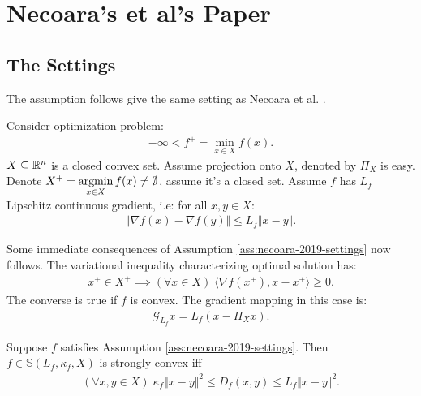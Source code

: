 \documentclass[12pt]{report}
\begin{document}
    \section{Necoara's et al's Paper}
        \subsection{The Settings}
            The assumption follows give the same setting as Necoara et al. \cite{necoara_linear_2019}. 
            \begin{assumption}\label{ass:necoara-2019-settings}
                Consider optimization problem: 
                \begin{align}
                    -\infty < f^+ = \min_{x \in X} f(x) . 
                \end{align}\label{problem:necoara-2019}
                $X\subseteq \mathbb R^n$ is a closed convex set. 
                Assume projection onto $X$, denoted by $\Pi_X$ is easy. 
                Denote $X^+ = \mathop{\rm argmin}\limits_{x \in X}f(x) \neq \emptyset$, assume it's a closed set. 
                Assume $f$ has $L_f$ Lipschitz continuous gradient, i.e: for all $x, y\in X$: 
                \begin{align*}
                    \Vert \nabla f(x) - \nabla f(y)\Vert \le L_f\Vert x - y\Vert. 
                \end{align*}
            \end{assumption}
            Some immediate consequences of Assumption \ref{ass:necoara-2019-settings} now follows. 
            The variational inequality characterizing optimal solution has: 
            \begin{align}\label{ineq:pg-opt-cond}
                x^+ \in X^+ \implies 
                (\forall x \in X)\; \langle \nabla f(x^+), x - x^+\rangle \ge 0. 
            \end{align}
            The converse is true if $f$ is convex. 
            The gradient mapping in this case is: 
            \begin{align*}
                \mathcal G_{L_f}x = L_f(x - \Pi_{X}x). 
            \end{align*}
            \begin{definition}\label{def:necoara-scnvx}
                Suppose $f$ satisfies Assumption \ref{ass:necoara-2019-settings}. 
                Then $f \in \mathbb S(L_f, \kappa_f, X)$ is strongly convex iff 
                \begin{align*}
                    (\forall x, y\in X)\; 
                    \kappa_f \Vert x - y\Vert^2 \le 
                    D_f(x, y) \le L_f \Vert x - y\Vert^2. 
                \end{align*}
            \end{definition}
\end{document}
